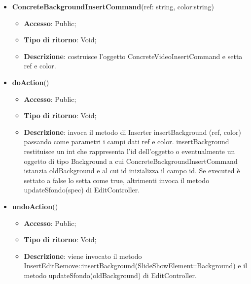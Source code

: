 {{{	
	\begin{itemize}
		\item \textbf{ConcreteBackgroundInsertCommand}(ref: string, color:string)
		\begin{itemize}
			\item \textbf{Accesso}: Public;
			\item \textbf{Tipo di ritorno}: Void;
			\item \textbf{Descrizione}: costruisce l’oggetto ConcreteVideoInsertCommand e setta ref e color.
		\end{itemize}
		\item \textbf{doAction}()
		\begin{itemize}
			\item \textbf{Accesso}: Public;
			\item \textbf{Tipo di ritorno}: Void;
			\item \textbf{Descrizione}: invoca il metodo di Inserter insertBackground (ref, color) passando come parametri i  campi dati ref e color. insertBackground restituisce un int che rappresenta l’id dell’oggetto o eventualmente un oggetto di tipo Background a cui ConcreteBackgroundInsertCommand istanzia oldBackground e al cui id inizializza il campo id. Se executed è settato a false lo setta come true, altrimenti invoca il metodo updateSfondo(spec) di EditController.
		\end{itemize}
		\item \textbf{undoAction}()
		\begin{itemize}
			\item \textbf{Accesso}: Public;
			\item \textbf{Tipo di ritorno}: Void;
			\item \textbf{Descrizione}: viene invocato il metodo InsertEditRemove::insertBackground(SlideShowElement::Background) e il metodo updateSfondo(oldBackground) di EditController.
		\end{itemize}
	\end{itemize}
	}

}}
